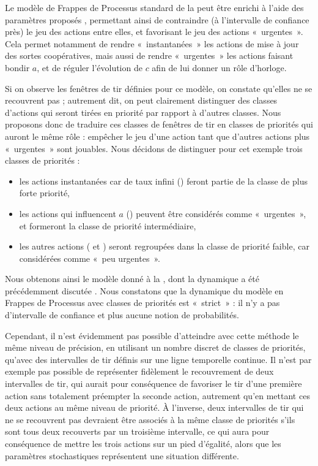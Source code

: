 \begin{example}
  Le modèle de Frappes de Processus standard de la 
  peut être enrichi à l'aide des paramètres proposés ,
  permettant ainsi
  de contraindre (à l'intervalle de confiance près) le jeu des actions entre elles,
  et favorisant le jeu des actions «~urgentes~».
  Cela permet notamment de rendre «~instantanées~»
  les actions de mise à jour des sortes coopératives,
  mais aussi de rendre «~urgentes~» les actions faisant bondir $a$,
  et de réguler l'évolution de $c$ afin de lui donner un rôle d'horloge.
  
  Si on observe les fenêtres de tir définies pour ce modèle, on constate qu'elles
  ne se recouvrent pas ; autrement dit, on peut clairement distinguer des classes
  d'actions qui seront tirées en priorité par rapport à d'autres classes.
  Nous proposons donc de traduire ces classes de fenêtres de tir en classes de priorités
  qui auront le même rôle : empêcher le jeu d'une action tant que d'autres actions
  plus «~urgentes~» sont jouables.
  Nous décidons de distinguer pour cet exemple trois classes de priorités :
  \begin{itemize}
    \item les actions instantanées car de taux infini (\stochainf) feront partie de la classe de
      plus forte priorité,
    \item les actions qui influencent $a$ (\stochaa) peuvent être considérés comme «~urgentes~»,
      et formeront la classe de priorité intermédiaire,
    \item les autres actions (\stochab{} et \stochac) seront regroupées dans la classe de priorité faible,
      car considérées comme «~peu urgentes~».
  \end{itemize}
  Nous obtenons ainsi le modèle donné à la ,
  dont la dynamique a été précédemment discutée .
  Nous constatons que la dynamique du modèle en Frappes de Processus avec classes de priorités
  est «~strict~» : il n'y a pas d'intervalle de confiance et plus aucune notion de probabilités.
\end{example}

Cependant, il n'est évidemment pas possible d'atteindre
avec cette méthode le même niveau de précision, en utilisant un nombre
discret de classes de priorités,
qu'avec des intervalles de tir définis sur une ligne temporelle continue.
Il n'est par exemple
pas possible de représenter fidèlement le recouvrement de deux intervalles de tir,
qui aurait pour conséquence de favoriser le tir d'une première action sans totalement
préempter la seconde action,
autrement qu'en mettant ces deux actions au même niveau de priorité.
À l'inverse, deux intervalles de tir qui ne se recouvrent pas devraient être associés à la même
classe de priorités s'ils sont tous deux recouverts par un troisième intervalle,
ce qui aura pour conséquence de mettre les trois actions sur un pied d'égalité, alors que les
paramètres stochastiques représentent une situation différente.

